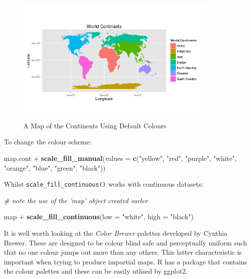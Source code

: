 \documentclass[]{article}
\newenvironment{Shaded}{}{}
\newcommand{\KeywordTok}[1]{\textcolor[rgb]{0.00,0.44,0.13}{\textbf{{#1}}}}
\newcommand{\DataTypeTok}[1]{\textcolor[rgb]{0.56,0.13,0.00}{{#1}}}
\newcommand{\StringTok}[1]{\textcolor[rgb]{0.25,0.44,0.63}{{#1}}}
\newcommand{\CommentTok}[1]{\textcolor[rgb]{0.38,0.63,0.69}{\textit{{#1}}}}
\newcommand{\NormalTok}[1]{{#1}}
\let\Oldincludegraphics\includegraphics
\renewcommand{\includegraphics}[1]{\Oldincludegraphics[width=10cm]{#1}}
\begin{document}
\begin{figure}[htbp]
\centering
\includegraphics{figure/A_Map_of_the_Continents_Using_Default_Colours.png}
\caption{A Map of the Continents Using Default Colours}
\end{figure}

To change the colour scheme:

\begin{Shaded}
\begin{Highlighting}[]
\NormalTok{map.cont + }\KeywordTok{scale_fill_manual}\NormalTok{(}\DataTypeTok{values =} \KeywordTok{c}\NormalTok{(}\StringTok{"yellow"}\NormalTok{, }\StringTok{"red"}\NormalTok{, }\StringTok{"purple"}\NormalTok{, }\StringTok{"white"}\NormalTok{, }
    \StringTok{"orange"}\NormalTok{, }\StringTok{"blue"}\NormalTok{, }\StringTok{"green"}\NormalTok{, }\StringTok{"black"}\NormalTok{))}
\end{Highlighting}
\end{Shaded}

Whilst \texttt{scale\_fill\_continuous()} works with continuous
datasets:

\begin{Shaded}
\begin{Highlighting}[]
\CommentTok{# note the use of the 'map' object created earler}

\NormalTok{map + }\KeywordTok{scale_fill_continuous}\NormalTok{(}\DataTypeTok{low =} \StringTok{"white"}\NormalTok{, }\DataTypeTok{high =} \StringTok{"black"}\NormalTok{)}
\end{Highlighting}
\end{Shaded}

It is well worth looking at the \emph{Color Brewer} palettes developed
by Cynthia Brewer. These are designed to be colour blind safe and
perceptually uniform such that no one colour jumps out more than any
others. This latter characteristic is important when trying to produce
impartial maps. R has a package that contains the colour palettes and
these can be easily utlised by ggplot2.
\end{document}
